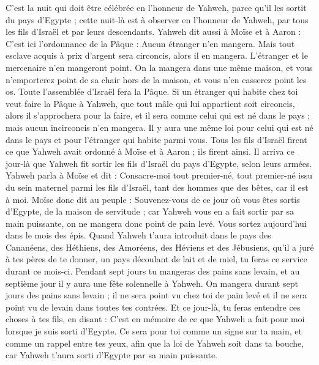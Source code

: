\begin{multicols}{2}
C'est la nuit qui doit être célébrée en l'honneur de Yahweh, parce qu'il les sortit du pays d'Egypte ; cette nuit-là est à observer en l'honneur de Yahweh, par tous les fils d'Israël et par leurs descendants.
Yahweh dit aussi à Moïse et à Aaron : C'est ici l'ordonnance de la Pâque : Aucun étranger n'en mangera.
Mais tout esclave acquis à prix d’argent sera circoncis, alors il en mangera.
L'étranger et le mercenaire n'en mangeront point.
On la mangera dans une même maison, et vous n'emporterez point de sa chair hors de la maison, et vous n'en casserez point les os.
Toute l'assemblée d'Israël fera la Pâque.
Si un étranger qui habite chez toi veut faire la Pâque à Yahweh, que tout mâle qui lui appartient soit circoncis, alors il s'approchera pour la faire, et il sera comme celui qui est né dans le pays ; mais aucun incirconcis n'en mangera.
Il y aura une même loi pour celui qui est né dans le pays et pour l'étranger qui habite parmi vous.
Tous les fils d'Israël firent ce que Yahweh avait ordonné à Moïse et à Aaron ; ils firent ainsi.
Il arriva ce jour-là que Yahweh fit sortir les fils d'Israël du pays d'Egypte, selon leurs armées.
\VerseOne{}Yahweh parla à Moïse et dit :
Consacre-moi tout premier-né, tout premier-né issu du sein maternel parmi les fils d'Israël, tant des hommes que des bêtes, car il est à moi.
Moïse donc dit au peuple : Souvenez-vous de ce jour où vous êtes sortis d'Egypte, de la maison de servitude ; car Yahweh vous en a fait sortir par sa main puissante, on ne mangera donc point de pain levé.
Vous sortez aujourd'hui dans le mois des épis.
Quand Yahweh t'aura introduit dans le pays des Cananéens, des Héthiens, des Amoréens, des Héviens et des Jébusiens, qu’il a juré à tes pères de te donner, un pays découlant de lait et de miel, tu feras ce service durant ce mois-ci.
Pendant sept jours tu mangeras des pains sans levain, et au septième jour il y aura une fête solennelle à Yahweh.
On mangera durant sept jours des pains sans levain ; il ne sera point vu chez toi de pain levé et il ne sera point vu de levain dans toutes tes contrées.
Et ce jour-là, tu feras entendre ces choses à tes fils, en disant : C'est en mémoire de ce que Yahweh a fait pour moi lorsque je suis sorti d'Egypte.
Ce sera pour toi comme un signe sur ta main, et comme un rappel entre tes yeux, afin que la loi de Yahweh soit dans ta bouche, car Yahweh t'aura sorti d'Egypte par sa main puissante.

\end{multicols}
